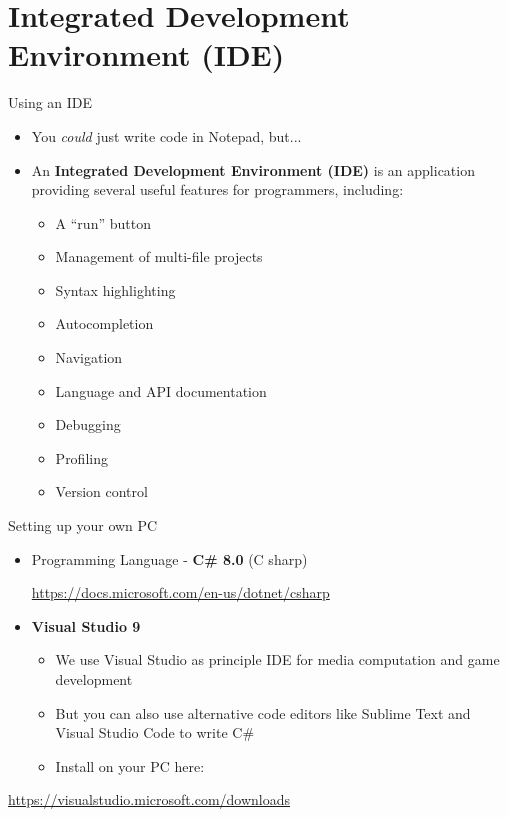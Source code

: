 \part{Integrated Development Environment (IDE)}
\frame{\partpage}

\begin{frame}{Using an IDE}
\begin{itemize}
	\item You \textit{could} just write code in Notepad, but...
	\item An \textbf{Integrated Development Environment (IDE)} is an application providing several
	useful features for programmers, including:
	\begin{itemize}
		\item A ``run'' button
		\item Management of multi-file projects
		\item Syntax highlighting
		\item Autocompletion
		\item Navigation
		\item Language and API documentation
		\item Debugging
		\item Profiling
		\item Version control
	\end{itemize}
\end{itemize}
\end{frame}

\begin{frame}[fragile]{Setting up your own PC}
\begin{itemize}
	\item Programming Language - \textbf {C\# 8.0} (C sharp)

		\small\url{https://docs.microsoft.com/en-us/dotnet/csharp}
		

	\item \textbf{Visual Studio 9}
	\begin{itemize}
	\item We use Visual Studio as principle IDE for media computation and game development
	\item But you can also use alternative code editors like Sublime Text and Visual Studio Code to write C\#
	\item Install on your PC here:
	\end{itemize}
\end{itemize}
 	\begin{itemize}
		\small\url{https://visualstudio.microsoft.com/downloads}		
	\end{itemize}
\end{frame}

